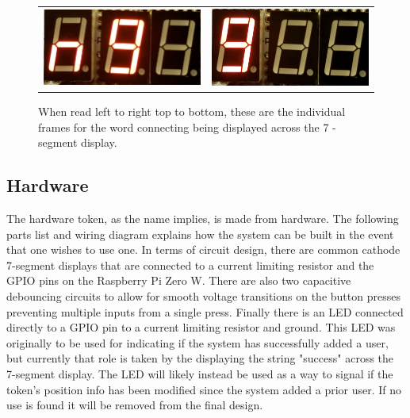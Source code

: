 \documentclass[a4paper,10pt]{article}
\begin{document}
\begin{figure}[H]
\begin{tabular}{cc}
    \includegraphics[width=60mm]{Assets/ng.png}&

    \includegraphics[width=60mm]{Assets/g.png}\\

  \end{tabular}
  
  \label{figur}\caption{When read left to right top to bottom, these are the individual frames for the word connecting being displayed across the 7 -segment display.}

\end{figure}

\pagebreak

\subsection{Hardware}
The hardware token, as the name implies, is made from hardware. The following parts list and wiring diagram explains how the system can be built in the event that one wishes to use one. In terms of circuit design, there are common cathode 7-segment displays that are connected to a current limiting resistor and the GPIO pins on the Raspberry Pi Zero W. There are also two capacitive debouncing circuits to allow for smooth voltage transitions on the button presses preventing multiple inputs from a single press. Finally there is an LED connected directly to a GPIO pin to a current limiting resistor and ground. This LED was originally to be used for indicating if the system has successfully added a user, but currently that role is taken by the displaying the string "success" across the 7-segment display. The LED will likely instead be used as a way to signal if the token's position info has been modified since the system added a prior user. If no use is found it will be removed from the final design.
\end{document}
